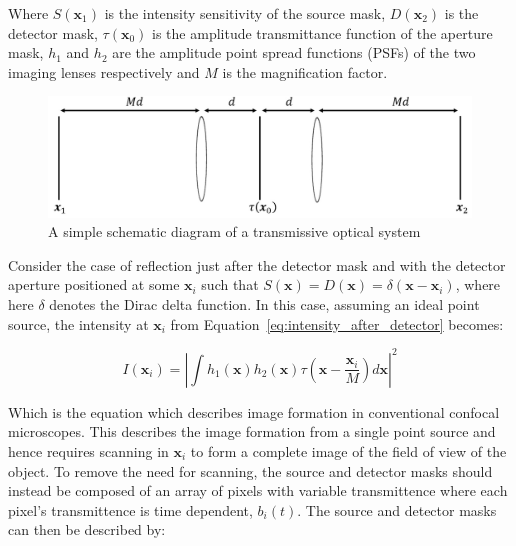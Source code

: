 Where $S\left(\textbf{x}_{1}\right)$ is the intensity sensitivity of the source mask, $D\left(\textbf{x}_{2}\right)$ is the detector mask, $\tau\left(\textbf{x}_{0}\right)$ is the amplitude transmittance function of the aperture mask, $h_{1}$ and $h_{2}$ are the amplitude point spread functions (PSFs) of the two imaging lenses respectively and $M$ is the magnification factor. 

\begin{figure}[h]
	\centering
	\includegraphics[width=\textwidth]{images/optical_system_schematic.jpg}
	\caption{A simple schematic diagram of a transmissive optical system}
	\label{fig:optical_system_schematic}
\end{figure}

Consider the case of reflection just after the detector mask and with the detector aperture positioned at some $\textbf{x}_{i}$ such that $S\left(\textbf{x}\right) = D\left(\textbf{x}\right) = \delta\left(\textbf{x} - \textbf{x}_{i}\right)$, where here $\delta$ denotes the Dirac delta function. In this case, assuming an ideal point source, the intensity at $\textbf{x}_{i}$ from Equation~\ref{eq:intensity_after_detector} becomes:

\begin{equation}\label{eq:confocal_image_form}
	I\left(\textbf{x}_{i}\right) = \left| \int h_{1}\left(\textbf{x}\right) h_{2}\left(\textbf{x}\right) \tau\left(\textbf{x} - \frac{\textbf{x}_{i}}{M}\right)d\textbf{x}\right|^{2}
\end{equation}

Which is the equation which describes image formation in conventional confocal microscopes.\cite{wilson1990confocal} This describes the image formation from a single point source and hence requires scanning in $\textbf{x}_{i}$ to form a complete image of the field of view of the object. To remove the need for scanning, the source and detector masks should instead be composed of an array of pixels with variable transmittence where each pixel's transmittence is time dependent, $b_{i}\left(t\right)$. The source and detector masks can then be described by:

